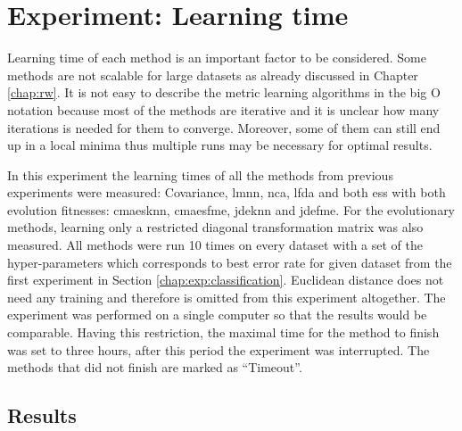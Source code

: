 \documentclass[12pt,a4paper]{report}
\begin{document}
\section{Experiment: Learning time} \label{chap:exp:learning-times}

Learning time of each method is an important factor to be considered. Some methods are not scalable for large datasets as already discussed in Chapter \ref{chap:rw}. It is not easy to describe the metric learning algorithms in the big O notation because most of the methods are iterative and it is unclear how many iterations is needed for them to converge. Moreover, some of them can still end up in a local minima thus multiple runs may be necessary for optimal results.

In this experiment the learning times of all the methods from previous experiments were measured: Covariance, \ac{lmnn}, \ac{nca}, \ac{lfda} and both \acp{es} with both evolution fitnesses: \ac{cmaesknn}, \ac{cmaesfme}, \ac{jdeknn} and \ac{jdefme}. For the evolutionary methods, learning only a restricted diagonal transformation matrix was also measured. All methods were run 10 times on every dataset with a set of the hyper-parameters which corresponds to best error rate for given dataset from the first experiment in Section \ref{chap:exp:classification}. Euclidean distance does not need any training and therefore is omitted from this experiment altogether. The experiment was performed on a single computer so that the results would be comparable. Having this restriction, the maximal time for the method to finish was set to three hours, after this period the experiment was interrupted. The methods that did not finish are marked as ``Timeout''.

\subsection{Results}
\end{document}
